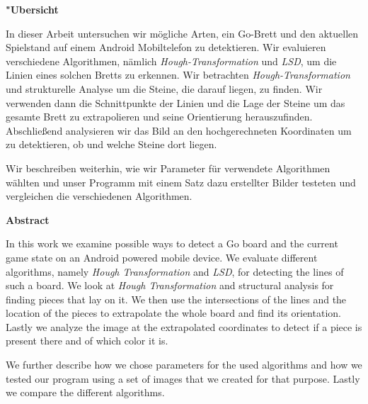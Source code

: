 \documentclass[english,bt]{package/lmedoc}
\begin{document}
\cleardoublepage

\begin{center}
\bfseries
"Ubersicht
\normalfont

In dieser Arbeit untersuchen wir mögliche Arten, ein Go-Brett und den aktuellen Spielstand auf einem Android Mobiltelefon zu detektieren. Wir evaluieren verschiedene Algorithmen, nämlich \emph{Hough-Transformation} und \emph{LSD}, um die Linien eines solchen Bretts zu erkennen. Wir betrachten \emph{Hough-Transformation} und strukturelle Analyse um die Steine, die darauf liegen, zu finden. Wir verwenden dann die Schnittpunkte der Linien und die Lage der Steine um das gesamte Brett zu extrapolieren und seine Orientierung herauszufinden. Abschließend analysieren wir das Bild an den hochgerechneten Koordinaten um zu detektieren, ob und welche Steine dort liegen.

Wir beschreiben weiterhin, wie wir Parameter für verwendete Algorithmen wählten und unser Programm mit einem Satz dazu erstellter Bilder testeten und vergleichen die verschiedenen Algorithmen.
\end{center}


\vspace{5.0cm}

\begin{center}
\bfseries
Abstract
\normalfont

In this work we examine possible ways to detect a Go board and the current game state on an Android powered mobile device. We evaluate different algorithms, namely \emph{Hough Transformation} and \emph{LSD}, for detecting the lines of such a board.  We look at \emph{Hough Transformation} and structural analysis for finding pieces that lay on it. We then use the intersections of the lines and the location of the pieces to extrapolate the whole board and find its orientation. Lastly we analyze the image at the extrapolated coordinates to detect if a piece is present there and of which color it is.

We further describe how we chose parameters for the used algorithms and how we tested our program using a set of images that we created for that purpose. Lastly we compare the different algorithms.
\end{center}

\cleardoublepage

\tableofcontents

\cleardoublepage {}


\cleardoublepage

\cleardoublepage

\cleardoublepage

\cleardoublepage

\cleardoublepage
\end{document}
